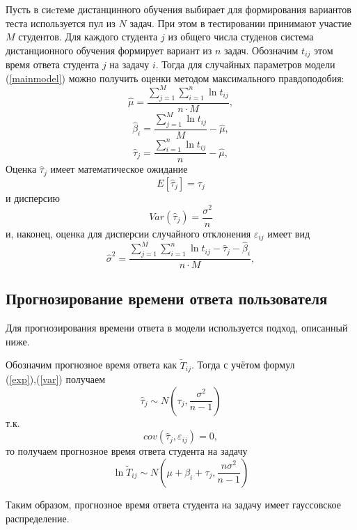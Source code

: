 Пусть в сиcтеме дистанцинного обучения выбирает для формирования вариантов теста используется пул из $N$ задач. При этом в тестировании принимают участие $M$ студентов. Для каждого студента $j$ из общего числа студенов система дистанционного обучения формирует вариант из $n$ задач. Обозначим $t_{ij}$ этом время ответа студента $j$ на задачу $i$. Тогда для случайных параметров модели (\ref{mainmodel}) можно получить оценки методом макси\-мального правдоподобия:
\begin{equation}
\hat{\mu} = \frac{\sum\limits_{j=1}^{M}\sum\limits_{i=1}^{n}\ln t_{ij}}{n \cdot M},
\end{equation}
\begin{equation}
\hat{\beta}_i = \frac{\sum\limits_{j=1}^{M}\ln t_{ij}}{M} - \hat{\mu},
\end{equation}
\begin{equation}
\hat{\tau}_j = \frac{\sum\limits_{i=1}^{n}\ln t_{ij}}{n} - \hat{\mu},
\end{equation}
Оценка $\hat{\tau}_j$ имеет математическое ожидание
\begin{equation}
\label{exp}
E[\hat{\tau}_j] = \tau_j
\end{equation}
и дисперсию
\begin{equation}
\label{var}
Var(\hat{\tau}_j) = \frac{\sigma^2}{n}
\end{equation}
и, наконец, оценка для дисперсии случайного отклонения $\varepsilon_{ij}$ имеет вид
\begin{equation}
\hat{\sigma}^2 = \frac{\sum\limits_{j=1}^{M}\sum\limits_{i=1}^{n}\ln t_{ij} - \hat{\tau}_j - \hat{\beta}_i}{n \cdot M},
\end{equation}

\subsection{Прогнозирование времени ответа пользователя}

Для прогнозирования времени ответа в модели используется подход, опи\-санный ниже.

Обозначим прогнозное время ответа как $\tilde{T}_{ij}$. Тогда с учётом формул \\(\ref{exp}),(\ref{var}) получаем
\begin{equation}
\hat{\tau}_j \sim N\left(\tau_j, \frac{\sigma^2}{n-1}\right)
\end{equation}
т.к.
\begin{equation}
cov(\hat{\tau}_j,\varepsilon_{ij}) = 0,
\end{equation}
то получаем прогнозное время ответа студента на задачу
\begin{equation}
\label{predictedtime}
\ln \tilde{T}_{ij} \sim N\left(\mu + \beta_i + \tau_j,\frac{n\sigma^2}{n-1}\right)
\end{equation}

Таким образом, прогнозное время ответа студента на задачу имеет гаус\-совское распределение.